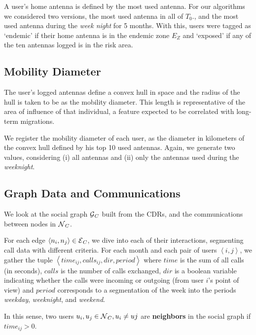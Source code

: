 A user's home antenna is defined by the most used antenna. For our algorithms we considered two versions, the most used antenna in all of $T_0$., and the most used antenna during the \textit{week night} for 5 months.
With this, users were tagged as `endemic' if their home antenna is in the endemic zone $E_Z$ and `exposed' if any of the ten antennas logged is in the risk area.


\subsection{Mobility Diameter}\label{section:def_mobility_diameter}

The user's logged antennas define a convex hull in space and the radius of the hull is taken to be as the mobility diameter. This length is representative of the area of influence of that individual, a feature expected to be correlated with long-term migrations.

We register the mobility diameter of each user, as the diameter in kilometers of the convex hull defined by his top 10 used antennas. Again, we generate two values, considering (i) all antennas and (ii) only the antennas used during the \textit{weeknight}.



\subsection{Graph Data and Communications}\label{section:def_graph_data}

We look at the social graph $\operatorname{\mathcal{G}}_C$ built from the CDRs, and the communications between nodes in $\operatorname{\mathcal{N}}_C$.

For each edge $\left< n_i, n_j \right> \in \operatorname{\mathcal{E}}_C$, we dive into each of their interactions, segmenting call data with different criteria. For %
each month and each pair of users $\left< i,j \right>$, we gather the tuple $\left< time_{ij}, calls_{ij}, dir, period \right>$ where $time$ is the sum of all calls (in seconds), $calls$ is the number of calls exchanged, $dir$ is a boolean variable indicating whether the calls were incoming or outgoing (from user $i$'s point of view) and $period$ corresponds to a segmentation of the week into the periods \textit{weekday}, \textit{weeknight}, and \textit{weekend}.


In this sense, two users $u_i, u_j \in \operatorname{\mathcal{N}}_C, u_i \neq uj$ are \textbf{neighbors} in the social graph if $time_{ij} > 0$.


